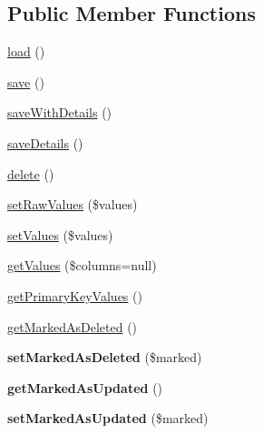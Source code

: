 \subsection*{Public Member Functions}
\begin{DoxyCompactItemize}
\item 
\hyperlink{classEntity_af2decf2a7bc0aef76e5adcd46a192e05}{load} ()
\item 
\hyperlink{classEntity_af4822c7e840cf775ca98c2fce2d8de49}{save} ()
\item 
\hyperlink{classEntity_ae8393dc2e8bc1fda9a5f47a145753b76}{saveWithDetails} ()
\item 
\hyperlink{classEntity_a48cdc3830bf695078a69a56f23e1b874}{saveDetails} ()
\item 
\hyperlink{classEntity_a59eae3c476f3996973400a024097c87e}{delete} ()
\item 
\hyperlink{classEntity_a4e945653aab38681177186fdc4787248}{setRawValues} (\$values)
\item 
\hyperlink{classEntity_ad346277daf8194b3c572ebdc82e435f3}{setValues} (\$values)
\item 
\hyperlink{classEntity_aec1be209327cfcf2dc528a3a565a7a5f}{getValues} (\$columns=null)
\item 
\hyperlink{classEntity_a659a3f3946feb4fd3301fe3f8f6d4851}{getPrimaryKeyValues} ()
\item 
\hyperlink{classEntity_abe1d992f6f319c4c2812163a8d2d1f66}{getMarkedAsDeleted} ()
\item 
\hypertarget{classEntity_a84588658abdfe8b253c807b3c3e8eb36}{
{\bfseries setMarkedAsDeleted} (\$marked)}
\label{classEntity_a84588658abdfe8b253c807b3c3e8eb36}

\item 
\hypertarget{classEntity_ac9cb9acce3628fd76e050ef1dff4ed43}{
{\bfseries getMarkedAsUpdated} ()}
\label{classEntity_ac9cb9acce3628fd76e050ef1dff4ed43}

\item 
\hypertarget{classEntity_a591fdd75bcec9b3e8561b378565c611b}{
{\bfseries setMarkedAsUpdated} (\$marked)}
\label{classEntity_a591fdd75bcec9b3e8561b378565c611b}

\end{DoxyCompactItemize}
